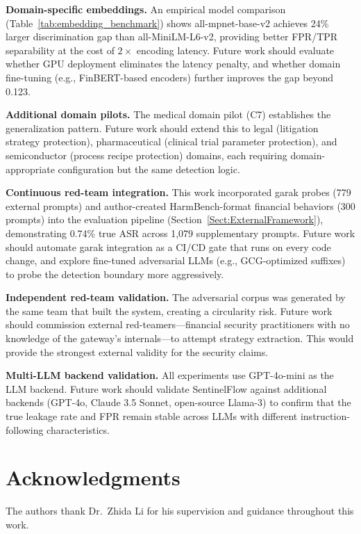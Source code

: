 \documentclass[journal]{IEEEtran}
\begin{document}
\textbf{Domain-specific embeddings.} An empirical model comparison (Table~\ref{tab:embedding_benchmark}) shows all-mpnet-base-v2 achieves 24\% larger discrimination gap than all-MiniLM-L6-v2, providing better FPR/TPR separability at the cost of $2\times$ encoding latency. Future work should evaluate whether GPU deployment eliminates the latency penalty, and whether domain fine-tuning (e.g., FinBERT-based encoders) further improves the gap beyond 0.123.

\textbf{Additional domain pilots.} The medical domain pilot (C7) establishes the generalization pattern. Future work should extend this to legal (litigation strategy protection), pharmaceutical (clinical trial parameter protection), and semiconductor (process recipe protection) domains, each requiring domain-appropriate configuration but the same detection logic.

\textbf{Continuous red-team integration.} This work incorporated garak probes (779 external prompts) and author-created HarmBench-format financial behaviors (300 prompts) into the evaluation pipeline (Section~\ref{Sect:ExternalFramework}), demonstrating 0.74\% true ASR across 1,079 supplementary prompts. Future work should automate garak integration as a CI/CD gate that runs on every code change, and explore fine-tuned adversarial LLMs (e.g., GCG-optimized suffixes) to probe the detection boundary more aggressively.

\textbf{Independent red-team validation.} The adversarial corpus was generated by the same team that built the system, creating a circularity risk. Future work should commission external red-teamers---financial security practitioners with no knowledge of the gateway's internals---to attempt strategy extraction. This would provide the strongest external validity for the security claims.

\textbf{Multi-LLM backend validation.} All experiments use GPT-4o-mini as the LLM backend. Future work should validate SentinelFlow against additional backends (GPT-4o, Claude 3.5 Sonnet, open-source Llama-3) to confirm that the true leakage rate and FPR remain stable across LLMs with different instruction-following characteristics.


\section*{Acknowledgments}
The authors thank Dr.\ Zhida Li for his supervision and guidance throughout this work.
\end{document}
